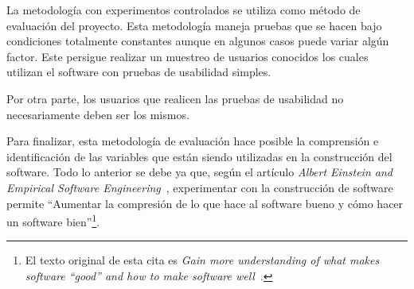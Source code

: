 
La metodología con experimentos controlados se utiliza como método de evaluación del proyecto. Esta metodología maneja pruebas que se hacen bajo condiciones totalmente constantes aunque en algunos casos puede variar algún factor. Este persigue realizar un muestreo de usuarios conocidos los cuales utilizan el software con pruebas de usabilidad simples.

Por otra parte, los usuarios que realicen las pruebas de usabilidad no necesariamente deben ser los mismos.

Para finalizar, esta metodología de evaluación hace posible la comprensión e identificación de las variables que están siendo utilizadas en la construcción del software.  Todo lo anterior se debe ya que, según el artículo \emph{Albert Einstein and Empirical Software Engineering}~\cite{8}, experimentar con la construcción de software permite ``Aumentar la compresión de lo que hace al software bueno y cómo hacer un software bien''\footnote{El texto original de esta cita es \emph{Gain more understanding of what makes software ``good'' and how to make software well}~\cite{8}.}.